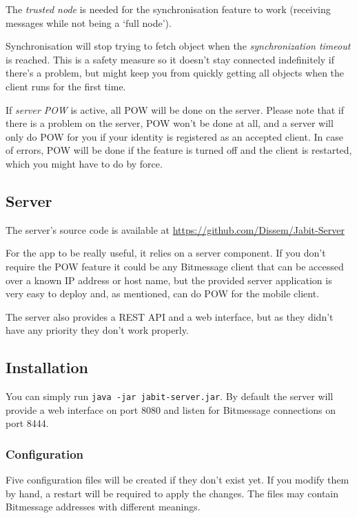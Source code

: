 \documentclass{bfh}
\begin{document}
  The \textit{trusted node} is needed for the synchronisation feature to work (receiving messages while not being a `full node').

  Synchronisation will stop trying to fetch object when the \textit{synchronization timeout} is reached. This is a safety measure so it doesn't stay connected indefinitely if there's a problem, but might keep you from quickly getting all objects when the client runs for the first time.

  If \textit{server POW} is active, all \ac{POW} will be done on the server. Please note that if there is a problem on the server, \ac{POW} won't be done at all, and a server will only do \ac{POW} for you if your identity is registered as an accepted client. In case of errors, \ac{POW} will be done if the feature is turned off and the client is restarted, which you might have to do by force.


  \subsection{Server}
  The server's source code is available at \url{https://github.com/Dissem/Jabit-Server}

  For the app to be really useful, it relies on a server component. If you don't require the \ac{POW} feature it could be any Bitmessage client that can be accessed over a known \acs{IP} address or host name, but the provided server application is very easy to deploy and, as mentioned, can do \ac{POW} for the mobile client.

  The server also provides a \acs{REST} \ac{API} and a web interface, but as they didn't have any priority they don't work properly.

  \subsection{Installation}
  You can simply run \texttt{java -jar jabit-server.jar}. By default the server will provide a web interface on port 8080 and listen for Bitmessage connections on port 8444.

  \subsubsection{Configuration}
  Five configuration files will be created if they don't exist yet. If you modify them by hand, a restart will be required to apply the changes. The files may contain Bitmessage addresses with different meanings.
\end{document}
